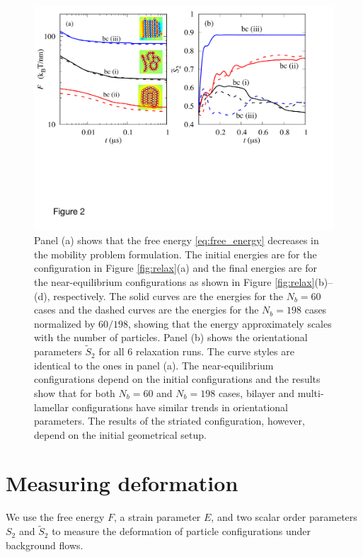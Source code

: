 \documentclass[aps,prl,preprint,groupedaddress]{revtex4-2}
\begin{document}
\begin{figure}
  \begin{center}
\includegraphics[width=1.0\textwidth]{Figures/Figure2.pdf}
  \end{center}
  \vspace{-20pt}  
  \caption{\label{fig:relax_energy}
  Panel (a) shows that the free energy \eqref{eq:free_energy} decreases
    in the mobility problem formulation.  The initial energies
    are for the configuration in Figure \ref{fig:relax}(a)
    and the final energies are for the near-equilibrium
    configurations as shown in Figure \ref{fig:relax}(b)--(d), respectively.
    The solid curves are the energies for the $N_b=60$ cases and  
    the dashed curves are the energies for the $N_b = 198$ cases normalized
    by $60/198$, showing that the energy approximately scales with the number of
    particles. 
    Panel (b) shows the orientational parameters $\tilde{S}_2$ for all 6 relaxation runs. 
    The curve styles are identical to the ones in panel (a).
    The near-equilibrium configurations depend on the initial configurations and the results show that for both $N_b=60$ and $N_b=198$ cases, bilayer and multi-lamellar configurations have similar trends in orientational parameters.
    The results of the striated configuration, however, depend on the initial geometrical setup.
  }
\end{figure}

\section{Measuring deformation}
We use the free energy $F$,
a strain parameter $E$, 
and two scalar order parameters $S_{2}$ and $\tilde S_2$ to measure
the deformation of particle configurations under background flows. 
\end{document}
